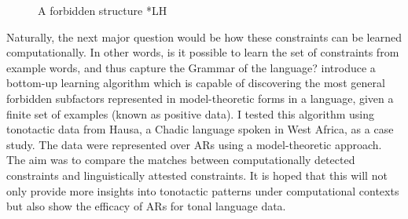 \documentclass[11pt,letterpaper]{article}
\begin{document}
\begin{figure}[ht]%
	\begin{multicols}{3}
		
		\subcaption{*$\check{\sigma}$}
		\label{cons:lh1}
	 
		\subcaption{*$\check{\sigma}\sigma$}
		\label{cons:lh2}
	
		\subcaption{*$\check{\sigma}\acute{\sigma}\acute{\sigma}$}
		\label{cons:lh3}
	
	\end{multicols}
	\caption{A forbidden structure *LH}
	\label{fig:notHLL}
\end{figure}

Naturally, the next major question would be how these constraints can be learned computationally. In other words, is it possible to learn the set of constraints from example words, and thus capture the Grammar of the language? \cite{chandleeLearningPartiallyOrdered2019} introduce a bottom-up learning algorithm which is capable of discovering the most general forbidden subfactors represented in model-theoretic forms in a language, given a finite set of examples (known as positive data). I tested this algorithm using tonotactic data from Hausa, a Chadic language spoken in West Africa, as a case study. The data were represented over ARs using a model-theoretic approach. The aim was to compare the matches between computationally detected constraints and linguistically attested constraints. It is hoped that this will not only provide more insights into tonotactic patterns under computational contexts but also show the efficacy of ARs for tonal language data. 
\end{document}
